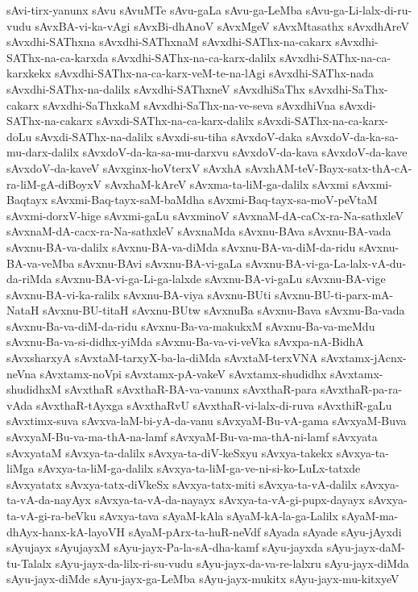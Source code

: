 {sAvi-tirx-yanunx
sAvu
sAvuMTe
sAvu-gaLa
sAvu-ga-LeMba
sAvu-ga-Li-lalx-di-ru-vudu
sAvxBA-vi-ka-vAgi
sAvxBi-dhAnoV
sAvxMgeV
sAvxMtasathx
sAvxdhAreV
sAvxdhi-SAThxna
sAvxdhi-SAThxnaM
sAvxdhi-SAThx-na-cakarx
sAvxdhi-SAThx-na-ca-karxda
sAvxdhi-SAThx-na-ca-karx-dalilx
sAvxdhi-SAThx-na-ca-karxkekx
sAvxdhi-SAThx-na-ca-karx-veM-te-na-lAgi
sAvxdhi-SAThx-nada
sAvxdhi-SAThx-na-dalilx
sAvxdhi-SAThxneV
sAvxdhiSaThx
sAvxdhi-SaThx-cakarx
sAvxdhi-SaThxkaM
sAvxdhi-SaThx-na-ve-seva
sAvxdhiVna
sAvxdi-SAThx-na-cakarx
sAvxdi-SAThx-na-ca-karx-dalilx
sAvxdi-SAThx-na-ca-karx-doLu
sAvxdi-SAThx-na-dalilx
sAvxdi-su-tiha
sAvxdoV-daka
sAvxdoV-da-ka-sa-mu-darx-dalilx
sAvxdoV-da-ka-sa-mu-darxvu
sAvxdoV-da-kava
sAvxdoV-da-kave
sAvxdoV-da-kaveV
sAvxginx-hoVterxV
sAvxhA
sAvxhAM-teV-Bayx-satx-thA-cA-ra-liM-gA-diBoyxV
sAvxhaM-kAreV
sAvxma-ta-liM-ga-dalilx
sAvxmi
sAvxmi-Baqtayx
sAvxmi-Baq-tayx-saM-baMdha
sAvxmi-Baq-tayx-sa-moV-peVtaM
sAvxmi-dorxV-hige
sAvxmi-gaLu
sAvxminoV
sAvxnaM-dA-caCx-ra-Na-sathxleV
sAvxnaM-dA-cacx-ra-Na-sathxleV
sAvxnaMda
sAvxnu-BAva
sAvxnu-BA-vada
sAvxnu-BA-va-dalilx
sAvxnu-BA-va-diMda
sAvxnu-BA-va-diM-da-ridu
sAvxnu-BA-va-veMba
sAvxnu-BAvi
sAvxnu-BA-vi-gaLa
sAvxnu-BA-vi-ga-La-lalx-vA-du-da-riMda
sAvxnu-BA-vi-ga-Li-ga-lalxde
sAvxnu-BA-vi-gaLu
sAvxnu-BA-vige
sAvxnu-BA-vi-ka-ralilx
sAvxnu-BA-viya
sAvxnu-BUti
sAvxnu-BU-ti-parx-mA-NataH
sAvxnu-BU-titaH
sAvxnu-BUtw
sAvxnuBa
sAvxnu-Bava
sAvxnu-Ba-vada
sAvxnu-Ba-va-diM-da-ridu
sAvxnu-Ba-va-makukxM
sAvxnu-Ba-va-meMdu
sAvxnu-Ba-va-si-didhx-yiMda
sAvxnu-Ba-va-vi-veVka
sAvxpa-nA-BidhA
sAvxsharxyA
sAvxtaM-tarxyX-ba-la-diMda
sAvxtaM-terxVNA
sAvxtamx-jAcnx-neVna
sAvxtamx-noVpi
sAvxtamx-pA-vakeV
sAvxtamx-shudidhx
sAvxtamx-shudidhxM
sAvxthaR
sAvxthaR-BA-va-vanunx
sAvxthaR-para
sAvxthaR-pa-ra-vAda
sAvxthaR-tAyxga
sAvxthaRvU
sAvxthaR-vi-lalx-di-ruva
sAvxthiR-gaLu
sAvxtimx-suva
sAvxva-laM-bi-yA-da-vanu
sAvxyaM-Bu-vA-gama
sAvxyaM-Buva
sAvxyaM-Bu-va-ma-thA-na-lamf
sAvxyaM-Bu-va-ma-thA-ni-lamf
sAvxyata
sAvxyataM
sAvxya-ta-dalilx
sAvxya-ta-diV-keSxyu
sAvxya-takekx
sAvxya-ta-liMga
sAvxya-ta-liM-ga-dalilx
sAvxya-ta-liM-ga-ve-ni-si-ko-LuLx-tatxde
sAvxyatatx
sAvxya-tatx-diVkeSx
sAvxya-tatx-miti
sAvxya-ta-vA-dalilx
sAvxya-ta-vA-da-nayAyx
sAvxya-ta-vA-da-nayayx
sAvxya-ta-vA-gi-pupx-dayayx
sAvxya-ta-vA-gi-ra-beVku
sAvxya-tava
sAyaM-kAla
sAyaM-kA-la-ga-Lalilx
sAyaM-ma-dhAyx-hanx-kA-layoVH
sAyaM-pArx-ta-huR-neVdf
sAyada
sAyade
sAyu-jAyxdi
sAyujayx
sAyujayxM
sAyu-jayx-Pa-la-sA-dha-kamf
sAyu-jayxda
sAyu-jayx-daM-tu-Talalx
sAyu-jayx-da-lilx-ri-su-vudu
sAyu-jayx-da-va-re-lalxru
sAyu-jayx-diMda
sAyu-jayx-diMde
sAyu-jayx-ga-LeMba
sAyu-jayx-mukitx
sAyu-jayx-mu-kitxyeV
}
